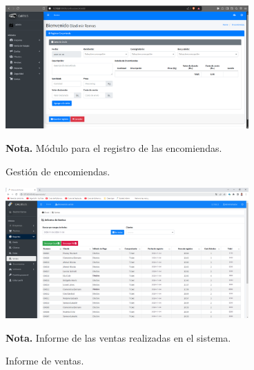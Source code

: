  \begin{figure}[!h] %
 	\caption[Gestión de encomiendas]
 	{\newline Gestión de encomiendas.} %
 	\centering
 	\includegraphics[width=0.83\textwidth]{imagenes/cap_3/Img_calibus/CALIBUS114.png} %
 	
 	\begin{flushleft}
 		\hspace{1.20cm} \textbf{Nota.} Módulo para el registro de las encomiendas. %
 	\end{flushleft}
 	\vspace{-16pt}
 	\label{fig:cali19} %
 \end{figure} 
 
 \begin{figure}[!h] %
 	\caption[Informe de ventas]
 	{\newline Informe de ventas.} %
 	\centering
 	\includegraphics[width=0.83\textwidth]{imagenes/cap_3/Img_calibus/CALIBUS19.png} %
 	
 	\begin{flushleft}
 		\hspace{1.20cm} \textbf{Nota.} Informe de las ventas realizadas en el sistema. %
 	\end{flushleft}
 	\vspace{-16pt}
 	\label{fig:cali20} %
 \end{figure}
 
